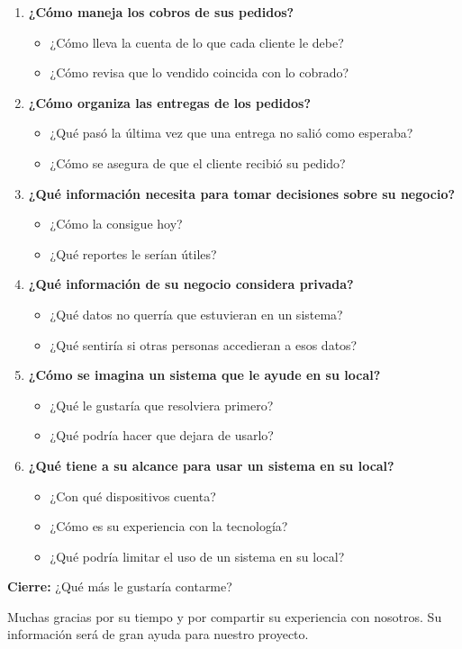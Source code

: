 \documentclass[11pt,a4paper]{article}
\newcommand{\etiqueta}[1]{\textcolor{uteqverde}{\bfseries #1}}
\begin{document}
\begin{enumerate}
		\item \textbf{¿Cómo maneja los cobros de sus pedidos?}
		\begin{itemize}
			\item ¿Cómo lleva la cuenta de lo que cada cliente le debe?
			\item ¿Cómo revisa que lo vendido coincida con lo cobrado?
		\end{itemize}

		\item \textbf{¿Cómo organiza las entregas de los pedidos?}
		\begin{itemize}
			\item ¿Qué pasó la última vez que una entrega no salió como esperaba?
			\item ¿Cómo se asegura de que el cliente recibió su pedido?
		\end{itemize}

		\item \textbf{¿Qué información necesita para tomar decisiones sobre su negocio?}
		\begin{itemize}
			\item ¿Cómo la consigue hoy?
			\item ¿Qué reportes le serían útiles?
		\end{itemize}

		\item \textbf{¿Qué información de su negocio considera privada?}
		\begin{itemize}
			\item ¿Qué datos no querría que estuvieran en un sistema?
			\item ¿Qué sentiría si otras personas accedieran a esos datos?
		\end{itemize}

		\item \textbf{¿Cómo se imagina un sistema que le ayude en su local?}
		\begin{itemize}
			\item ¿Qué le gustaría que resolviera primero?
			\item ¿Qué podría hacer que dejara de usarlo?
		\end{itemize}

		\item \textbf{¿Qué tiene a su alcance para usar un sistema en su local?}
		\begin{itemize}
			\item ¿Con qué dispositivos cuenta?
			\item ¿Cómo es su experiencia con la tecnología?
			\item ¿Qué podría limitar el uso de un sistema en su local?
		\end{itemize}
	\end{enumerate}

	\etiqueta{Cierre:} ¿Qué más le gustaría contarme?

	Muchas gracias por su tiempo y por compartir su experiencia con nosotros. Su información será de gran ayuda para nuestro proyecto.
\end{document}
